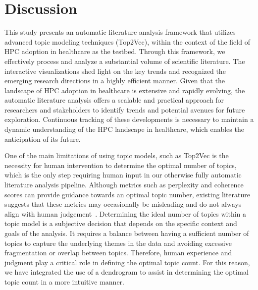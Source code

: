 \section{Discussion}\label{se:2-5}

This study presents an automatic literature analysis framework that utilizes advanced topic modeling techniques (Top2Vec), within the context of the field of HPC adoption in healthcare as the testbed. Through this framework, we effectively process and analyze a substantial volume of scientific literature. The interactive visualizations shed light on the key trends and recognized the emerging research directions in a highly efficient manner. Given that the landscape of HPC adoption in healthcare is extensive and rapidly evolving, the automatic literature analysis offers a scalable and practical approach for researchers and stakeholders to identify trends and potential avenues for future exploration. Continuous tracking of these developments is necessary to maintain a dynamic understanding of the HPC landscape in healthcare, which enables the anticipation of its future.

One of the main limitations of using topic models, such as Top2Vec is the necessity for human intervention to determine the optimal number of topics, which is the only step requiring human input in our otherwise fully automatic literature analysis pipeline. Although metrics such as perplexity and coherence scores can provide guidance towards an optimal topic number, existing literature suggests that these metrics may occasionally be misleading and do not always align with human judgement~\cite{hasan2021normalized,harrando2021apples}. Determining the ideal number of topics within a topic model is a subjective decision that depends on the specific context and goals of the analysis. It requires a balance between having a sufficient number of topics to capture the underlying themes in the data and avoiding excessive fragmentation or overlap between topics. Therefore, human experience and judgment play a critical role in defining the optimal topic count. For this reason, we have integrated the use of a dendrogram to assist in determining the optimal topic count in a more intuitive manner.

